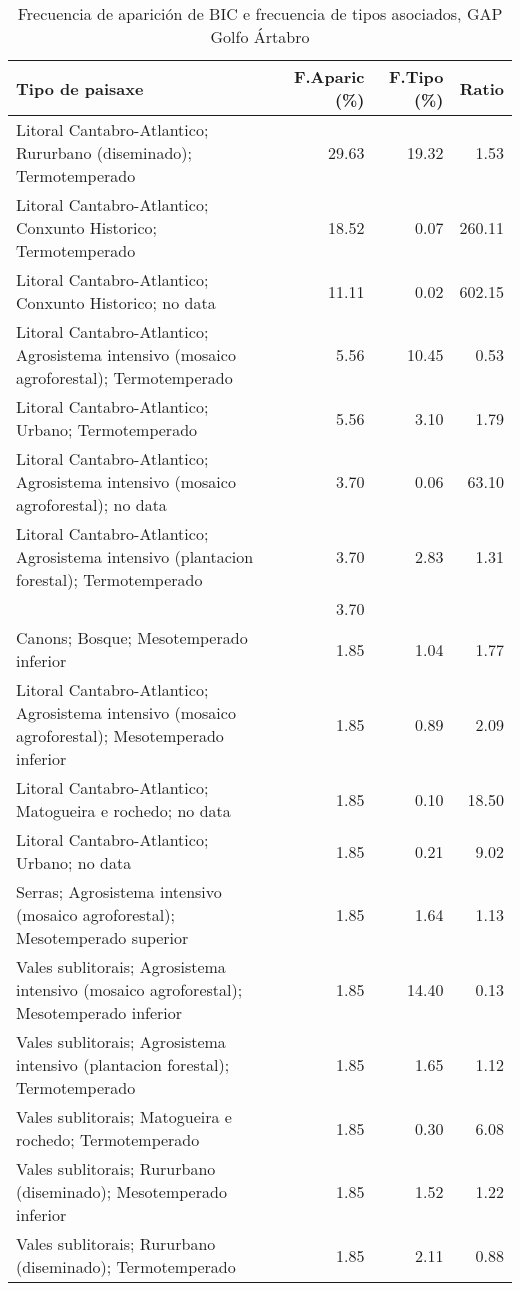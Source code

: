 \begin{table}[p]
\centering
\caption{Frecuencia de aparición de BIC e frecuencia de tipos asociados, GAP Golfo Ártabro} 
\label{vbic1}
\begin{tabular}{lrrr}
  \hline
Tipo de paisaxe & F.Aparic (\%) & F.Tipo (\%) & Ratio \\ 
  \hline
Litoral Cantabro-Atlantico; Rururbano (diseminado); Termotemperado & 29.63 & 19.32 & 1.53 \\ 
  Litoral Cantabro-Atlantico; Conxunto Historico; Termotemperado & 18.52 & 0.07 & 260.11 \\ 
  Litoral Cantabro-Atlantico; Conxunto Historico; no data & 11.11 & 0.02 & 602.15 \\ 
  Litoral Cantabro-Atlantico; Agrosistema intensivo (mosaico agroforestal); Termotemperado & 5.56 & 10.45 & 0.53 \\ 
  Litoral Cantabro-Atlantico; Urbano; Termotemperado & 5.56 & 3.10 & 1.79 \\ 
  Litoral Cantabro-Atlantico; Agrosistema intensivo (mosaico agroforestal); no data & 3.70 & 0.06 & 63.10 \\ 
  Litoral Cantabro-Atlantico; Agrosistema intensivo (plantacion forestal); Termotemperado & 3.70 & 2.83 & 1.31 \\ 
   & 3.70 &  &  \\ 
  Canons; Bosque; Mesotemperado inferior & 1.85 & 1.04 & 1.77 \\ 
  Litoral Cantabro-Atlantico; Agrosistema intensivo (mosaico agroforestal); Mesotemperado inferior & 1.85 & 0.89 & 2.09 \\ 
  Litoral Cantabro-Atlantico; Matogueira e rochedo; no data & 1.85 & 0.10 & 18.50 \\ 
  Litoral Cantabro-Atlantico; Urbano; no data & 1.85 & 0.21 & 9.02 \\ 
  Serras; Agrosistema intensivo (mosaico agroforestal); Mesotemperado superior & 1.85 & 1.64 & 1.13 \\ 
  Vales sublitorais; Agrosistema intensivo (mosaico agroforestal); Mesotemperado inferior & 1.85 & 14.40 & 0.13 \\ 
  Vales sublitorais; Agrosistema intensivo (plantacion forestal); Termotemperado & 1.85 & 1.65 & 1.12 \\ 
  Vales sublitorais; Matogueira e rochedo; Termotemperado & 1.85 & 0.30 & 6.08 \\ 
  Vales sublitorais; Rururbano (diseminado); Mesotemperado inferior & 1.85 & 1.52 & 1.22 \\ 
  Vales sublitorais; Rururbano (diseminado); Termotemperado & 1.85 & 2.11 & 0.88 \\ 
   \hline
\end{tabular}
\end{table}
